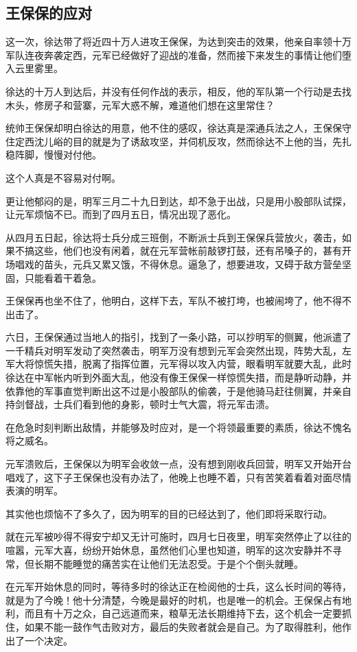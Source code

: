 \begin{multicols}{\theparacolNo}
		\subsection{王保保的应对}
		这一次，徐达带了将近四十万人进攻王保保，为达到突击的效果，他亲自率领十万军队连夜奔袭定西，元军已经做好了迎战的准备，然而接下来发生的事情让他们堕入云里雾里。

		徐达的十万人到达后，并没有任何作战的表示，相反，他的军队第一个行动是去找木头，修房子和营寨，元军大惑不解，难道他们想在这里常住？

		统帅王保保却明白徐达的用意，他不住的感叹，徐达真是深通兵法之人，王保保守住定西沈儿峪的目的就是为了诱敌攻坚，并伺机反攻，然而徐达不上他的当，先扎稳阵脚，慢慢对付他。

		这个人真是不容易对付啊。

		更让他郁闷的是，明军三月二十九日到达，却不急于出战，只是用小股部队试探，让元军烦恼不已。而到了四月五日，情况出现了恶化。

		从四月五日起，徐达将士兵分成三班倒，不断派士兵到王保保兵营放火，袭击，如果不搞这些，他们也没有闲着，就在元军营帐前敲锣打鼓，还有吊嗓子的，甚有开场唱戏的苗头，元兵又累又饿，不得休息。逼急了，想要进攻，又碍于敌方营垒坚固，只能看着干着急。

		王保保再也坐不住了，他明白，这样下去，军队不被打垮，也被闹垮了，他不得不出击了。

		六日，王保保通过当地人的指引，找到了一条小路，可以抄明军的侧翼，他派遣了一千精兵对明军发动了突然袭击，明军万没有想到元军会突然出现，阵势大乱，左军大将惊慌失措，脱离了指挥位置，元军得以攻入内营，眼看明军就要大乱，此时徐达在中军帐内听到外面大乱，他没有像王保保一样惊慌失措，而是静听动静，并依靠他的军事直觉判断出这不过是小股部队的偷袭，于是他骑马赶往侧翼，并亲自持剑督战，士兵们看到他的身影，顿时士气大震，将元军击溃。

		在危急时刻判断出敌情，并能够及时应对，是一个将领最重要的素质，徐达不愧名将之威名。

		元军溃败后，王保保以为明军会收敛一点，没有想到刚收兵回营，明军又开始开台唱戏了，这下子王保保也没有办法了，他晚上也睡不着，只有苦笑着看着对面尽情表演的明军。

		其实他也烦恼不了多久了，因为明军的目的已经达到了，他们即将采取行动。

		就在元军被吵得不得安宁却又无计可施时，四月七日夜里，明军突然停止了以往的喧嚣，元军大喜，纷纷开始休息，虽然他们心里也知道，明军的这次安静并不寻常，但长期不能睡觉的痛苦实在让他们无法忍受。于是个个倒头就睡。

		在元军开始休息的同时，等待多时的徐达正在检阅他的士兵，这么长时间的等待，就是为了今晚！他十分清楚，今晚是最好的时机，也是唯一的机会。王保保占有地利，而且有十万之众，自己远道而来，粮草无法长期维持下去，这个机会一定要抓住，如果不能一鼓作气击败对方，最后的失败者就会是自己。为了取得胜利，他作出了一个决定。


\end{multicols}
